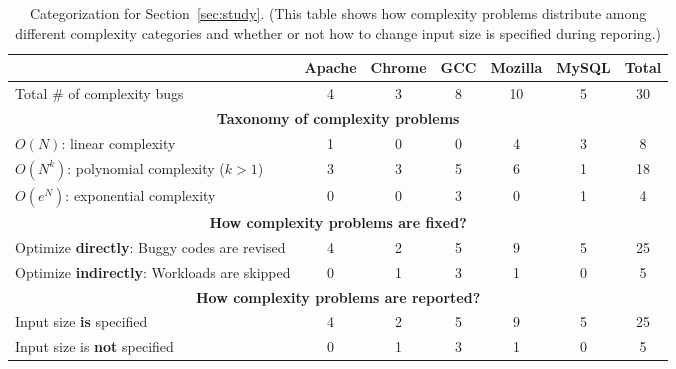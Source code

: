 \begin{table}[tb!]
\begin{adjustwidth}{-.5in}{-.5in}
\small
\centering
{
\begin{tabular}{|lcccccc|}
\hline
                                                                                  &   Apache  &   Chrome   &  GCC   &    Mozilla   &   MySQL  &  Total\\
\hline
Total \# of complexity bugs                                                       &   4       &    3       &   8    &    10        &   5      &   30 \\
\hline
\multicolumn{7}{|c|}{\bf Taxonomy of complexity problems}\\
\multicolumn{1}{|l}{{\bf $O(N)$}: linear complexity}                              &   1       &    0       &   0    &    4         &   3      &   8\\
\multicolumn{1}{|l}{{\bf $O(N^k)$}: polynomial complexity ($k>1$)}                &   3       &    3       &   5    &    6         &   1      &  18\\
\multicolumn{1}{|l}{{\bf $O(e^N)$}: exponential complexity}                       &   0       &    0       &   3    &    0         &   1      &   4\\
\hline
\multicolumn{7}{|c|}{\bf How complexity problems are fixed?}\\
\multicolumn{1}{|l}{Optimize {\bf directly}: Buggy codes are revised}              &  4        &    2       &   5    &    9         &   5      &  25\\
\multicolumn{1}{|l}{Optimize {\bf indirectly}: Workloads are skipped}                                        &  0        &    1       &   3    &    1         &   0      &   5\\
\hline
\multicolumn{7}{|c|}{\bf How complexity problems are reported?}\\
\multicolumn{1}{|l}{Input size {\bf is} specified}                                &  4        &    2       &   5    &    9&5&25\\
\multicolumn{1}{|l}{Input size is {\bf not} specified}                            &  0        &    1       &   3    &    1    &0&5\\
\hline
\end{tabular}
}
\end{adjustwidth}
\caption{Categorization for Section~\ref{sec:study}.
\footnotesize{(This table shows how complexity problems distribute among different complexity categories 
 and whether or not how to change input size is specified during reporing.)}}
\label{tab:study}
\vspace{-0.1in}
\end{table}